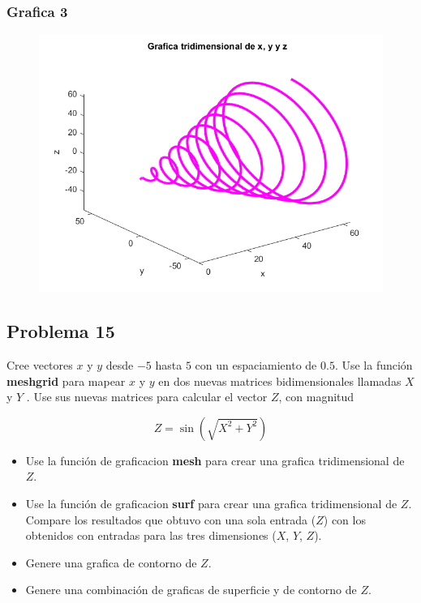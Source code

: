 \documentclass{article}
\begin{document}
	\subsubsection{Grafica 3}
	
	\begin{figure}[h]
		\centering
		\includegraphics[width=\textwidth]{grafica21c.png}
	\end{figure}
	
	\newpage
	
	\subsection{Problema 15}
	
	Cree vectores $x$ y $y$ desde $-5$ hasta $5$ con un espaciamiento de $0.5$. Use la función \textbf{meshgrid} para mapear $x$ y $y$ en dos nuevas matrices bidimensionales llamadas $X$ y $Y$ . Use sus nuevas matrices para calcular el vector $Z$, con magnitud
	
	\begin{equation*}
		Z = \sin(\sqrt{X^2 + Y^2})
	\end{equation*}
	
	\begin{itemize}
		\item Use la función de graficacion \textbf{mesh} para crear una grafica tridimensional de $Z$.
		\item Use la función de graficacion \textbf{surf} para crear una grafica tridimensional de $Z$.
		Compare los resultados que obtuvo con una sola entrada ($Z$) con los obtenidos con entradas para las tres dimensiones ($X$, $Y$, $Z$).
		\item Genere una grafica de contorno de $Z$.
		\item Genere una combinación de graficas de superficie y de contorno de $Z$.
	\end{itemize}
	
\end{document}
